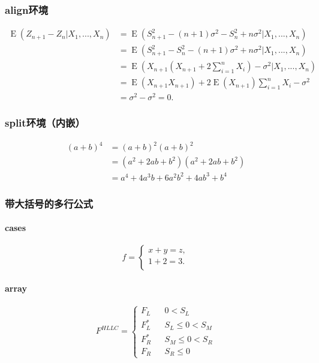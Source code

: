 \subsubsection{align环境}
\begin{align*}
    \operatorname{E} (Z_{n+1} - Z_n | X_1,..., X_n)
    &= \operatorname{E} (S_{n+1}^2 - (n+1) \sigma^2 - S_n^2 + n \sigma^2 | X_1,..., X_n) \\
    &= \operatorname{E} (S_{n+1}^2 - S_n^2 - (n+1) \sigma^2 + n \sigma^2 | X_1,..., X_n) \\
    &= \operatorname{E} (X_{n+1}(X_{n+1} + 2\sum_{i=1}^n X_i) - \sigma^2 | X_1,..., X_n) \\
    &= \operatorname{E} (X_{n+1}X_{n+1})
       + 2\operatorname{E} (X_{n+1}) \sum_{i=1}^n X_i - \sigma^2 \\
    &= \sigma^2  - \sigma^2 =0.
\end{align*}

\subsubsection{split环境（内嵌）}
\begin{equation*}
    \begin{split}
    (a + b)^4
      &= (a + b)^2 (a + b)^2      \\
      &= (a^2 + 2ab + b^2)
         (a^2 + 2ab + b^2)        \\
      &= a^4 + 4a^3b + 6a^2b^2 + 4ab^3 + b^4
    \end{split}
\end{equation*}

\subsubsection{带大括号的多行公式}
\paragraph{cases}
$$
    f=
    \begin{cases}
      x + y = z,  \\
      1 + 2 = 3.  \\
    \end{cases}
$$

\paragraph{array}
$$ F^{HLLC}=\left\{
\begin{array}{rcl}
F_L       &      & {0      <      S_L}\\
F^*_L     &      & {S_L \leq 0 < S_M}\\
F^*_R     &      & {S_M \leq 0 < S_R}\\
F_R       &      & {S_R \leq 0}
\end{array} \right. $$
    
